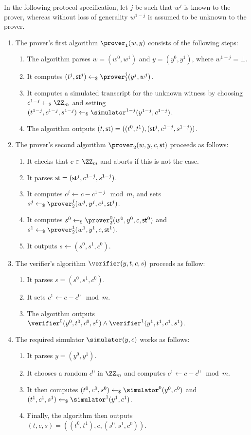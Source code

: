 \documentclass[runningheads]{llncs}
\begin{document}
  In the following protocol specification, let $j$ be such that $w^j$ is known to the prover, whereas without loss of generality $w^{1-j}$ is assumed to be unknown to the prover.
\begin{enumerate}
  \item
    The prover's first algorithm $\prover_1(w,y)$ consists of the following steps:
    \begin{enumerate}
      \item
        The algorithm parses $w=(w^0,w^1)$ and $y=(y^0,y^1)$, where $w^{1-j}=\bot$.
      \item
        It computes $(t^j,\st^j)\getsr\prover_1^j(y^j,w^j)$.
      \item
        It computes a simulated transcript for the unknown witness by choosing $c^{1-j}\getsr\ZZ_m$ and setting $(t^{1-j},c^{1-j},s^{1-j})\getsr\simulator^{1-j}(y^{1-j},c^{1-j})$.
      \item
	The algorithm outputs $(t,\mathsf{st}) = ((t^0,t^1),(\mathsf{st}^j,c^{1-j},s^{1-j}))$.
    \end{enumerate}
  \item
    The prover's second algorithm $\prover_2(w,y,c,\st)$ proceeds as follows:
    \begin{enumerate}
      \item
        It checks that $c\in\ZZ_m$ and aborts if this is not the case.
      \item
	It parses $\mathsf{st}=(\mathsf{st}^j,c^{1-j},s^{1-j})$.
      \item
        It computes $c^j\gets c-c^{1-j}\mod m$, and sets $s^j\getsr\prover_2^j(w^j,y^j,c^j,\st^j)$.
      \item
        It computes $s^0\getsr\prover_2^0(w^0,y^0,c,\st^0)$ and $s^1\getsr\prover_2^1(w^1,y^1,c,\st^1)$.
      \item
        It outputs $s\gets(s^0,s^1,c^0)$.
    \end{enumerate}
  \item
    The verifier's algorithm $\verifier(y,t,c,s)$ proceeds as follow:
    \begin{enumerate}
      \item
        It  parses $s=(s^0,s^1,c^0)$.
      \item
        It sets $c^1\gets c-c^0\mod m$.
      \item
	The algorithm outputs $\verifier^0(y^0,t^0,c^0,s^0)\land\verifier^1(y^1,t^1,c^1,s^1)$.
    \end{enumerate}
  \item
    The required simulator $\simulator(y,c)$ works as follows:
    \begin{enumerate}
      \item
        It parses $y=(y^0,y^1)$.
      \item
        It chooses a random $c^0$ in $\ZZ_m$ and computes $c^1\gets c-c^0 \mod m$.
      \item
        It then computes $(t^0,c^0,s^0)\getsr\simulator^0(y^0,c^0)$ and $(t^1,c^1,s^1)\getsr\simulator^1(y^1,c^1)$.
      \item
        Finally, the algorithm then outputs $(t,c,s)=((t^0,t^1),c,(s^0,s^1,c^0))$.
    \end{enumerate}
\end{enumerate}
\end{document}
